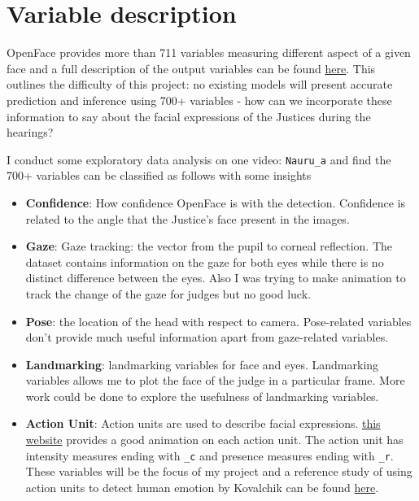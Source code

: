\documentclass{monashthesis}
\begin{document}
\hypertarget{variable-description}{%
\section{Variable description}\label{variable-description}}

OpenFace provides more than 711 variables measuring different aspect of a given face and a full description of the output variables can be found \href{https://github.com/TadasBaltrusaitis/OpenFace/wiki/Action-Units}{here}. This outlines the difficulty of this project: no existing models will present accurate prediction and inference using 700+ variables - how can we incorporate these information to say about the facial expressions of the Justices during the hearings?

I conduct some exploratory data analysis on one video: \texttt{Nauru\_a} and find the 700+ variables can be classified as follows with some insights

\begin{itemize}
\item
  \textbf{Confidence}: How confidence OpenFace is with the detection. Confidence is related to the angle that the Justice's face present in the images.
\item
  \textbf{Gaze}: Gaze tracking: the vector from the pupil to corneal reflection. The dataset contains information on the gaze for both eyes while there is no distinct difference between the eyes. Also I was trying to make animation to track the change of the gaze for judges but no good luck.
\item
  \textbf{Pose}: the location of the head with respect to camera. Pose-related variables don't provide much useful information apart from gaze-related variables.
\item
  \textbf{Landmarking}: landmarking variables for face and eyes. Landmarking variables allows me to plot the face of the judge in a particular frame. More work could be done to explore the usefulness of landmarking variables.
\item
  \textbf{Action Unit}: Action units are used to describe facial expressions. \href{https://imotions.com/blog/facial-action-coding-system/}{this website} provides a good animation on each action unit. The action unit has intensity measures ending with \texttt{\_c} and presence measures ending with \texttt{\_r}. These variables will be the focus of my project and a reference study of using action units to detect human emotion by Kovalchik can be found \href{http://www.sloansportsconference.com/wp-content/uploads/2018/02/2005.pdf}{here}.
\end{itemize}
\end{document}
